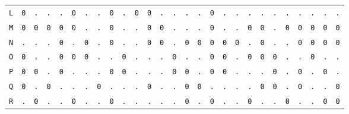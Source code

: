 \begin{figure}[H]
\begin{center}
{\begin{tabular}{c|cccccccccccccccccccccccccc}
				\texttt{L} & \texttt{0} & \texttt{.} & \texttt{.} & \texttt{.} & \texttt{0} & \texttt{.} & \texttt{.} & \texttt{0} & \texttt{.} & \texttt{0} & \texttt{0} & \texttt{.} & \texttt{.} & \texttt{.} & \texttt{.} & \texttt{0} & \texttt{.} & \texttt{.} & \texttt{.} & \texttt{.} & \texttt{.} & \texttt{.} & \texttt{.} & \texttt{.} & \texttt{.} & \texttt{.} \\
				\texttt{M} & \texttt{0} & \texttt{0} & \texttt{0} & \texttt{0} & \texttt{0} & \texttt{.} & \texttt{.} & \texttt{0} & \texttt{.} & \texttt{.} & \texttt{0} & \texttt{0} & \texttt{.} & \texttt{.} & \texttt{.} & \texttt{0} & \texttt{.} & \texttt{.} & \texttt{0} & \texttt{0} & \texttt{.} & \texttt{0} & \texttt{0} & \texttt{0} & \texttt{0} & \texttt{0} \\
				\texttt{N} & \texttt{.} & \texttt{.} & \texttt{.} & \texttt{0} & \texttt{.} & \texttt{0} & \texttt{.} & \texttt{0} & \texttt{.} & \texttt{.} & \texttt{0} & \texttt{0} & \texttt{.} & \texttt{0} & \texttt{0} & \texttt{0} & \texttt{0} & \texttt{0} & \texttt{.} & \texttt{0} & \texttt{.} & \texttt{.} & \texttt{0} & \texttt{0} & \texttt{0} & \texttt{0} \\
				\texttt{O} & \texttt{0} & \texttt{.} & \texttt{.} & \texttt{0} & \texttt{0} & \texttt{0} & \texttt{.} & \texttt{.} & \texttt{0} & \texttt{.} & \texttt{.} & \texttt{.} & \texttt{0} & \texttt{.} & \texttt{.} & \texttt{0} & \texttt{0} & \texttt{.} & \texttt{0} & \texttt{0} & \texttt{0} & \texttt{.} & \texttt{.} & \texttt{0} & \texttt{.} & \texttt{.} \\
				\texttt{P} & \texttt{0} & \texttt{0} & \texttt{.} & \texttt{0} & \texttt{.} & \texttt{.} & \texttt{.} & \texttt{0} & \texttt{0} & \texttt{.} & \texttt{.} & \texttt{.} & \texttt{0} & \texttt{0} & \texttt{.} & \texttt{0} & \texttt{0} & \texttt{.} & \texttt{.} & \texttt{.} & \texttt{0} & \texttt{.} & \texttt{0} & \texttt{.} & \texttt{0} & \texttt{.} \\
				\texttt{Q} & \texttt{0} & \texttt{.} & \texttt{0} & \texttt{.} & \texttt{.} & \texttt{.} & \texttt{0} & \texttt{.} & \texttt{.} & \texttt{.} & \texttt{0} & \texttt{.} & \texttt{.} & \texttt{0} & \texttt{0} & \texttt{.} & \texttt{.} & \texttt{.} & \texttt{.} & \texttt{0} & \texttt{0} & \texttt{.} & \texttt{0} & \texttt{.} & \texttt{.} & \texttt{0} \\
				\texttt{R} & \texttt{.} & \texttt{0} & \texttt{.} & \texttt{.} & \texttt{0} & \texttt{.} & \texttt{.} & \texttt{0} & \texttt{.} & \texttt{.} & \texttt{.} & \texttt{.} & \texttt{.} & \texttt{0} & \texttt{.} & \texttt{0} & \texttt{.} & \texttt{.} & \texttt{0} & \texttt{.} & \texttt{.} & \texttt{0} & \texttt{.} & \texttt{.} & \texttt{0} & \texttt{0} \\

\end{tabular}}
\end{center}
\end{figure}
